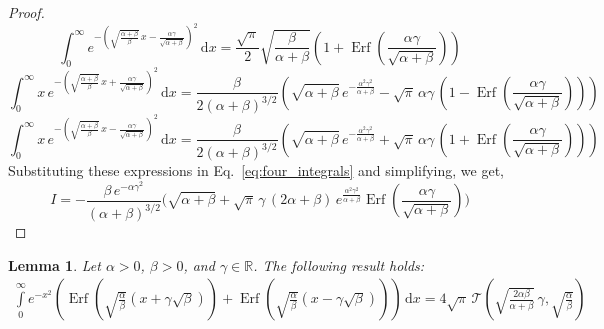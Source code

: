 \documentclass[journal]{IEEEtran}
\theoremstyle{plain}
\newtheorem{lemma}[theorem]{Lemma}
\theoremstyle{definition}
\theoremstyle{remark}
\newcommand{\R}{\mathbb{R}}
\newcommand{\Ot}{\mathcal{T}}
\newcommand{\Erf}{\operatorname{Erf}}
\newcommand{\dd}{\mathrm{d}}
\begin{document}
\begin{proof}
\begin{equation}
    \int_{0}^\infty e^{-\left(\sqrt{\frac{\alpha +\beta }{\beta }} \, x - \frac{\alpha  \gamma }{\sqrt{\alpha +\beta }} \right)^2} \, \dd x = \frac{\sqrt{\pi }}{2} \sqrt{\frac{\beta }{\alpha +\beta }} \left(1 + \Erf\left(\frac{\alpha  \gamma }{\sqrt{\alpha +\beta }}\right)\right)
\end{equation}
\begin{equation}
    \int_{0}^\infty x\, e^{-\left(\sqrt{\frac{\alpha +\beta }{\beta }} \, x + \frac{\alpha  \gamma }{\sqrt{\alpha +\beta }} \right)^2} \, \dd x = \frac{\beta}{2 (\alpha +\beta )^{3/2}}  \left(\sqrt{\alpha +\beta } \, e^{-\frac{\alpha ^2 \gamma ^2}{\alpha +\beta }}-\sqrt{\pi } \, \alpha  \gamma  \,\left(1-\Erf\left(\frac{\alpha  \gamma }{\sqrt{\alpha +\beta }}\right)\right)\right)
\end{equation}
\begin{equation}
    \int_{0}^\infty x\, e^{-\left(\sqrt{\frac{\alpha +\beta }{\beta }} \, x - \frac{\alpha  \gamma }{\sqrt{\alpha +\beta }} \right)^2} \, \dd x = \frac{\beta}{2 (\alpha +\beta )^{3/2}}  \left(\sqrt{\alpha +\beta } \, e^{-\frac{\alpha ^2 \gamma ^2}{\alpha +\beta }}+\sqrt{\pi } \, \alpha  \gamma  \,\left(1+\Erf\left(\frac{\alpha  \gamma }{\sqrt{\alpha +\beta }}\right)\right)\right)
\end{equation}
Substituting these expressions in Eq.~\eqref{eq:four_integrals} and simplifying, we get,
\begin{equation}
    I = -\frac{\beta \, e^{-\alpha  \gamma ^2} }{(\alpha +\beta )^{3/2}} \biggl(\sqrt{\alpha +\beta } +\sqrt{\pi } \,\gamma \, (2 \alpha +\beta ) \, e^{\frac{\alpha ^2 \gamma ^2}{\alpha +\beta }} \Erf\left(\frac{\alpha  \gamma }{\sqrt{\alpha +\beta }}\right)\biggr)
\end{equation}

\end{proof}

\begin{lemma} \label{lemma:I2222}
Let $\alpha > 0$, $\beta > 0$, and $\gamma \in \R$. The following result holds:
\begin{equation}
\begin{split}
    \int\limits_{0}^\infty e^{-x^2}\left(\Erf\left(\sqrt{\frac{\alpha}{\beta}}\left(x+\gamma\sqrt{\beta}\right)\right)+\Erf\left(\sqrt{\frac{\alpha}{\beta}}\left(x-\gamma\sqrt{\beta}\right) \right)\right) \,\dd x = 4 \sqrt{\pi} \,\Ot\left(\sqrt{\frac{2 \alpha \beta}{\alpha + \beta}} \, \gamma, \sqrt{\frac{\alpha}{\beta}}\right)
\end{split}
\end{equation}
\end{lemma}
 
\end{document}
